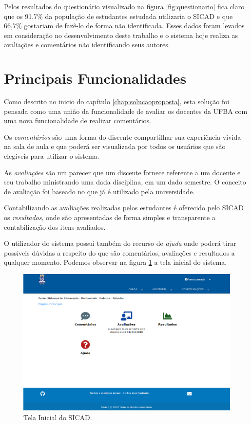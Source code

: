 \documentclass[12pt, a4paper]{report}
\begin{document}
Pelos resultados do questionário visualizado na figura \ref{fig:questionario} fica claro que os 91,7\% da população de estudantes estudada utilizaria o SICAD e que 66,7\% gostariam de fazê-lo de forma não identificada. Esses dados foram levados em consideração no desenvolvimento deste trabalho e o sistema hoje realiza as avaliações e comentários não identificando seus autores.


\section{ Principais Funcionalidades}

Como descrito no inicio do capítulo \ref{chap:solucaoproposta}, esta solução foi pensada como uma união da funcionalidade de avaliar os docentes da UFBA com uma nova funcionalidade de realizar comentários.

Os \textit{comentários} são uma forma do discente compartilhar sua experiência vivida na sala de aula e que poderá ser visualizada por todos os usuários que são elegíveis para utilizar o sistema.

As \textit{avaliações} são um parecer que um discente fornece referente a um docente e seu trabalho ministrando uma dada disciplina, em um dado semestre. O conceito de avaliação foi baseado no que já é utilizado pela universidade.

Contabilizando as avaliações realizadas pelos estudantes é oferecido pelo \ac{SICAD} os \textit{resultados}, onde são apresentadas de forma simples e transparente a contabilização dos itens avaliados.

O utilizador do sistema possui também do recurso de \textit{ajuda} onde poderá tirar possíveis dúvidas a respeito do que são comentários, avaliações e resultados a qualquer momento. Podemos observar na figura \ref{fig:home_administrador} a tela inicial do sistema.
\begin{figure}
\centering
\includegraphics[scale=0.5]{home_administrador2.png}
\caption{Tela Inicial do SICAD.}
\label{fig:home_administrador}
\end{figure}
\end{document}
